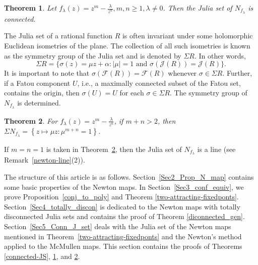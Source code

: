\documentclass[12pt]{article}
\newtheorem{maintheorem}{Theorem}
\numberwithin{equation}{section}
\begin{document}
\begin{maintheorem}\label{New_Mc}
Let $f_\lambda (z)=z^m-\frac{\lambda}{z^n}, m,n  \geq 1,   \lambda \neq 0$. Then the Julia set of $N_{f_{\lambda}}$ is connected.
\end{maintheorem}
The Julia set of a rational function $R$ is often invariant under some holomorphic Euclidean isometries of the plane. The collection of all such isometries is known as the symmetry group of the Julia set and is denoted by $\Sigma R$. In other words,
$$\Sigma R=\{\sigma(z)=\mu z +\alpha: |\mu|=1 \text{ and } \sigma(\mathcal{J}(R))=\mathcal{J}(R)\}.$$
It is important to note that $\sigma(\mathcal{F}(R)) = \mathcal{F}(R) $  whenever $\sigma \in \Sigma R$. Further, if a Fatou component $U$, i.e., a maximally connected subset of the Fatou set, contains the origin, then $\sigma (U)=U$ for each $\sigma \in \Sigma R$. The symmetry group of $N_{f_\lambda}$ is determined.
\begin{maintheorem}\label{McM_sym}
For $f_\lambda(z)=z^m-\frac{\lambda}{z^n}$,	if $m+n>2$, then	$ \Sigma N_{f_\lambda}=\left\{z \mapsto \mu z: \mu^{m+n}=1\right\}$.
\end{maintheorem}
  If $m=n=1$ is taken in Theorem~\ref{McM_sym}, then the Julia set of $N_{f_\lambda}$ is a line (see Remark~\ref{newton-line}(2)).
  \par 
  The structure of this article is as follows. Section~\ref{Sec2_Prop_N_map} contains some basic properties of the Newton maps. In Section~\ref{Sec3_conf_equiv}, we prove Proposition~\ref{conj_to_poly} and Theorem \ref{two-attracting-fixedponts}. Section~\ref{Sec4_totally_discon} is dedicated to the Newton maps with totally disconnected Julia sets and contains the proof of Theorem \ref{diconnected_gen}. Section~\ref{Sec5_Conn_J_set} deals with the Julia set of the Newton maps mentioned in Theorem~\ref{two-attracting-fixedponts} and the Newton's method applied to the McMullen maps. This section contains the proofs of Theorems \ref{connected-JS}, \ref{New_Mc}, and \ref{McM_sym}.
  
\end{document}
